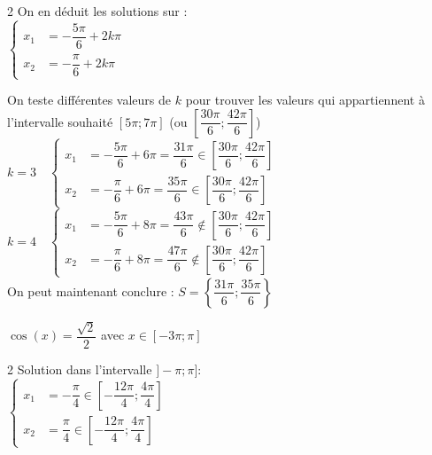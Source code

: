 \documentclass[11pt,a4paper]{article}  %
\begin{document}
\begin{enumMet}
\begin{corrBox}
\begin{multicols}{2}
			\columnbreak
			On en déduit les solutions sur \R:\\
			$\begin{cases}
				x_1 &=-\dfrac{5\pi}{6}+2k\pi\\
				x_2 &=-\dfrac{\pi}{6}+2k\pi\
			\end{cases}$\\
		\end{multicols}
		On teste différentes valeurs de $k$ pour trouver les valeurs qui appartiennent à l'intervalle souhaité $\left[5\pi;7\pi\right]$ (ou $\left[\dfrac{30\pi}{6};\dfrac{42\pi}{6}\right]$)\\
		$k=3\quad \begin{cases}
			x_1 &=-\dfrac{5\pi}{6}+6\pi=\dfrac{31\pi}{6}\in\left[\dfrac{30\pi}{6};\dfrac{42\pi}{6}\right]\\
			x_2 &=-\dfrac{\pi}{6}+6\pi=\dfrac{35\pi}{6}\in\left[\dfrac{30\pi}{6};\dfrac{42\pi}{6}\right]
		\end{cases}$\\
		$k=4\quad \begin{cases}
			x_1 &=-\dfrac{5\pi}{6}+8\pi=\dfrac{43\pi}{6}\notin\left[\dfrac{30\pi}{6};\dfrac{42\pi}{6}\right]\\
			x_2 &=-\dfrac{\pi}{6}+8\pi=\dfrac{47\pi}{6}\notin\left[\dfrac{30\pi}{6};\dfrac{42\pi}{6}\right]
		\end{cases}$\\
		On peut maintenant conclure : $S=\left\{\dfrac{31\pi}{6};\dfrac{35\pi}{6}\right\}$
	\end{corrBox}
	\item $\cos(x)=\dfrac{\sqrt{2}}{2}$ avec $x\in \left[-3\pi;\pi\right]$\\
	\begin{corrBox}
		\begin{multicols}{2}
			Solution dans l'intervalle $]-\pi;\pi]$:\\
			$\begin{cases}
				x_1 &=-\dfrac{\pi}{4}\in\left[-\dfrac{12\pi}{4};\dfrac{4\pi}{4}\right]\\
				x_2 &=\dfrac{\pi}{4}\in\left[-\dfrac{12\pi}{4};\dfrac{4\pi}{4}\right]
			\end{cases}$\\
			

\end{multicols}
\end{corrBox}
\end{enumMet}
\end{document}
